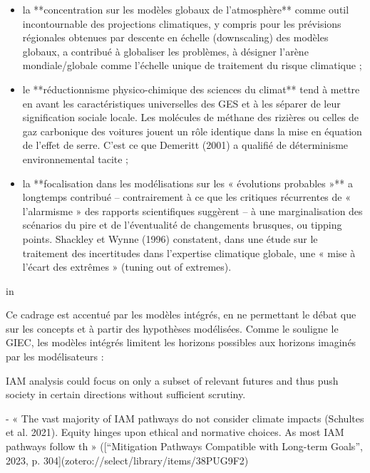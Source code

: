 \begin{displayquote}
\begin{itemize}
    \item la **concentration sur les modèles globaux de l’atmosphère** comme outil incontournable des projections climatiques, y compris pour les prévisions régionales obtenues par descente en échelle (downscaling) des modèles globaux, a contribué à globaliser les problèmes, à désigner l’arène mondiale/globale comme l’échelle unique de traitement du risque climatique ;
	\item le **réductionnisme physico-chimique des sciences du climat** tend à mettre en avant les caractéristiques universelles des GES et à les séparer de leur signification sociale locale. Les molécules de méthane des rizières ou celles de gaz carbonique des voitures jouent un rôle identique dans la mise en équation de l’effet de serre. C’est ce que Demeritt (2001) a qualifié de déterminisme environnemental tacite ;
	\item la **focalisation dans les modélisations sur les « évolutions probables »** a longtemps contribué – contrairement à ce que les critiques récurrentes de « l’alarmisme » des rapports scientifiques suggèrent – à une marginalisation des scénarios du pire et de l’éventualité de changements brusques, ou tipping points. Shackley et Wynne (1996) constatent, dans une étude sur le traitement des incertitudes dans l’expertise climatique globale, une « mise à l’écart des extrêmes » (tuning out of extremes).
\end{itemize}

in \cite{aykut_gouverner_nodate}
\end{displayquote}

Ce cadrage est accentué par les modèles intégrés, en ne permettant le débat que sur les concepts et à partir des hypothèses modélisées. Comme le souligne le GIEC, les modèles intégrés limitent les horizons possibles aux horizons imaginés par les modélisateurs : 

\begin{displayquote}
    IAM analysis could focus on only a subset of relevant futures and thus push society in certain directions without sufficient scrutiny. \cite{intergovernmental_panel_on_climate_change_ipcc_annex_2023}
\end{displayquote}

\begin{displayquote}
    - « The vast majority of IAM pathways do not consider climate impacts (Schultes et al. 2021). Equity hinges upon ethical and normative choices. As most IAM pathways follow th » ([“Mitigation Pathways Compatible with Long-term Goals”, 2023, p. 304](zotero://select/library/items/38PUG9F2)
\end{displayquote}

